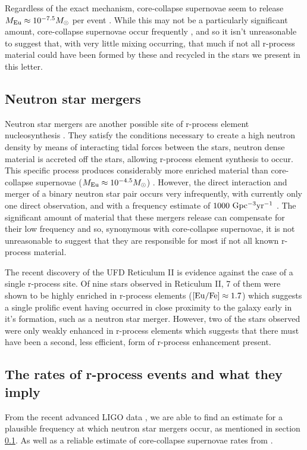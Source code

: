 \documentclass[a4paper,fleqn,usenatbib]{mnras}
\begin{document}
	Regardless of the exact mechanism, core-collapse supernovae seem to release $M_{\rm{Eu}}\approx10^{-7.5} M_{\odot}$ per event \citep{Argast2004} . While this may not be a particularly significant amount, core-collapse supernovae occur frequently \citep[$44700\ \rm{Gpc}^{-3} \rm{yr^{-1}}$;][]{Li2011}, and so it isn't unreasonable to suggest that, with very little mixing occurring, that much if not all r-process material could have been formed by these and recycled in the stars we present in this letter.
	
	\subsection{Neutron star mergers}
	\label{NSmerg}
	Neutron star mergers are another possible site of r-process element nucleosynthesis \citep{Kasen2017,Hotok2013,Drout2017}. They satisfy the conditions necessary to create a high neutron density by means of interacting tidal forces between the stars, neutron dense material is accreted off the stars, allowing r-process element synthesis to occur. This specific process produces considerably more enriched material than core-collapse supernovae ($M_{\rm{Eu}}\approx10^{-4.5} M_{\odot}$) \citep{Goriely2011}. However, the direct interaction and merger of a binary neutron star pair occurs very infrequently, with currently only one direct observation, and with a frequency estimate of $1000\ \rm{Gpc^{-3}yr^{-1}}$ \citep{LIGO2016}. The significant amount of material that these mergers release can compensate for their low frequency and so, synonymous with core-collapse supernovae, it is not unreasonable to suggest that they are responsible for most if not all known r-process material. 

	The recent discovery of the UFD Reticulum II \citep{Ji2016} is evidence against the case of a single r-process site. Of nine stars observed in Reticulum II, 7 of them were shown to be highly enriched in r-process elements ($\rm{[Eu/Fe]\approx1.7}$) which suggests a single prolific event having occurred in close proximity to the galaxy early in it's formation, such as a neutron star merger. However, two of the stars observed were only weakly enhanced in r-process elements which suggests that there must have been a second, less efficient, form of r-process enhancement present.
	
	\subsection{The rates of r-process events and what they imply}
	\label{rates}
	From the recent advanced LIGO data \citep{LIGO2016}, we are able to find an estimate for a plausible frequency at which neutron star mergers occur, as mentioned in section \ref{NSmerg}. As well as a reliable estimate of core-collapse supernovae rates from \citet{Li2011}.
	
\end{document}
